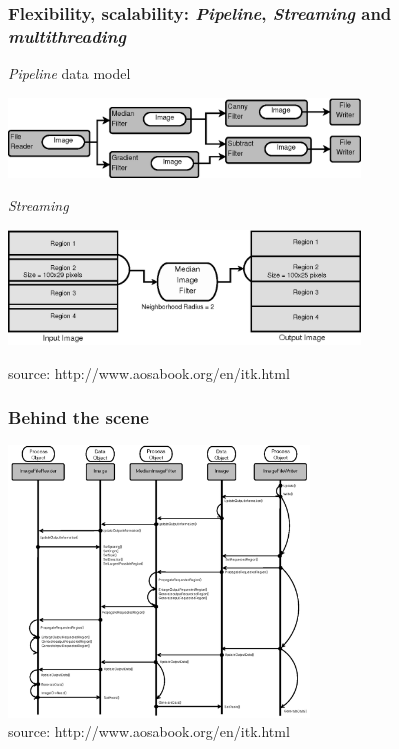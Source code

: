 \documentclass[8pt]{beamer}
\begin{document}
\begin{frame}
\frametitle{Flexibility, scalability: \textit{Pipeline}, \textit{Streaming} and \textit{multithreading}}

\begin{block}{\textit{Pipeline} data model}
\begin{center}
\includegraphics[width=0.7\textwidth]{images/ProcessObjectDataObject.png}
\end{center}
\end{block}
\vspace{-0.5cm}
\begin{block}{\textit{Streaming}}
\begin{center}
\includegraphics[width=0.7\textwidth]{images/StreamingImageDiagram.png}
\end{center}
\end{block}
\vspace{-0.5cm}
\begin{center}
\tiny{source: http://www.aosabook.org/en/itk.html}
\end{center}
\end{frame}

\begin{frame}
\frametitle{Behind the scene}
\begin{center}
\includegraphics[width=0.6\textwidth]{images/ProcessObjectDataObjectInteractionUML.png}\\
\tiny{source: http://www.aosabook.org/en/itk.html}
\end{center}
\end{frame}
\end{document}
